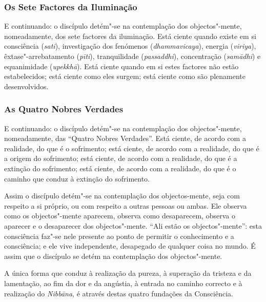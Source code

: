 \subsubsection{Os Sete Factores da Iluminação}


E continuando: o discípulo detém"-se na contemplação dos objectos"-mente,
nomeadamente, dos sete factores da iluminação. Está ciente quando existe em si
consciência (\emph{sati}), investigação dos fenómenos (\emph{dhammavicaya}),
energia (\emph{viriya}), êxtase"-arrebatamento (\emph{pīti}), tranquilidade
(\emph{passaddhi}), concentração (\emph{samādhi}) e equanimidade
(\emph{upekkhā}). Está ciente quando em si estes factores não estão
estabelecidos; está ciente como eles surgem; está ciente como são plenamente
desenvolvidos.

\subsubsection{As Quatro Nobres Verdades}


E continuando: o discípulo detém"-se na contemplação dos objectos"-mente,
nomeadamente, das “Quatro Nobres Verdades”. Está ciente, de acordo com a
realidade, do que é o sofrimento; está ciente, de acordo com a realidade, do que
é a origem do sofrimento; está ciente, de acordo com a realidade, do que é a
extinção do sofrimento; está ciente, de acordo com a realidade, do que é o
caminho que conduz à extinção do sofrimento.

Assim o discípulo detém"-se na contemplação dos objectos-mente, seja com
respeito a si próprio, ou com respeito a outras pessoas ou ambas. Ele observa
como os objectos"-mente aparecem, observa como desaparecem, observa o aparecer e
o desaparecer dos objectos"-mente. “Ali estão os objectos"-mente”: esta
consciência faz"-se nele presente ao ponto de permitir o conhecimento e a
consciência; e ele vive independente, desapegado de qualquer coisa no mundo. É
assim que o discípulo se detém na contemplação dos objectos"-mente.

A única forma que conduz à realização da pureza, à superação da tristeza e da
lamentação, ao fim da dor e da angústia, à entrada no caminho correcto e à
realização do \emph{Nibbāna}, é através destas quatro fundações da Consciência.



